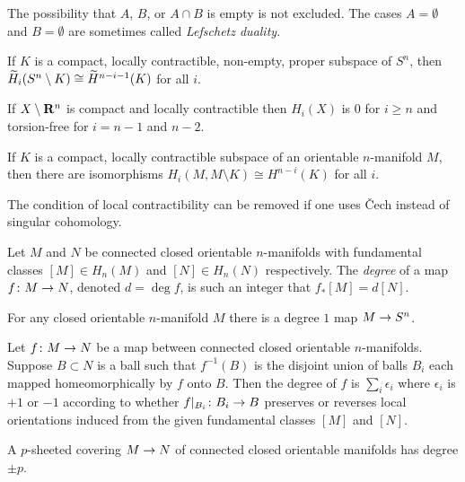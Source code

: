The possibility that $A$, $B$, or $A \cap B$ is empty is not excluded. The cases $A = \emptyset$ and $B = \emptyset$ are sometimes called \emph{Lefschetz duality}.

\begin{theorem}
  If $K$ is a compact, locally contractible, non-empty, proper subspace of $S^n$, then $\widetilde{H}_i(S^n \setminus K) \cong \widetilde{H}^{n-i-1}(K)$ for all $i$.
\end{theorem}

\begin{corollary}
  If $X \setminus \mathbf{R}^n$ is compact and locally contractible then $H_i(X)$ is $0$ for $i \geq n$ and torsion-free for $i = n-1$ and $n-2$.
\end{corollary}

\begin{proposition}
  If $K$ is a compact, locally contractible subspace of an orientable $n$-manifold $M$, then there are isomorphisms $H_i(M, M \setminus K) \cong H^{n-i}(K)$ for all $i$.
\end{proposition}

The condition of local contractibility can be removed if one uses \v{C}ech instead of singular cohomology.

\begin{definition}
  Let $M$ and $N$ be connected closed orientable $n$-manifolds with fundamental classes $[M] \in H_n(M)$ and $[N] \in H_n(N)$ respectively. The \emph{degree} of a map $f \colon M \rightarrow N$, denoted $d = \deg f$, is such an integer that $f_\ast[M] = d [N]$.
\end{definition}

\begin{proposition}
  For any closed orientable $n$-manifold $M$ there is a degree $1$ map $M \rightarrow S^n$.
\end{proposition}

\begin{proposition}
  Let $f \colon M \rightarrow N$ be a map between connected closed orientable $n$-manifolds. Suppose $B \subset N$ is a ball such that $f^{-1}(B)$ is the disjoint union of balls $B_i$ each mapped homeomorphically by $f$ onto $B$. Then the degree of $f$ is $\sum_i \epsilon_i$ where $\epsilon_i$ is $+1$ or $-1$ according to whether $f|_{B_i} \colon B_i \rightarrow B$ preserves or reverses local orientations induced from the given fundamental classes $[M]$ and $[N]$.
\end{proposition}

\begin{proposition}
  A $p$-sheeted covering $M \rightarrow N$ of connected closed orientable manifolds has degree $\pm p$.
\end{proposition}

